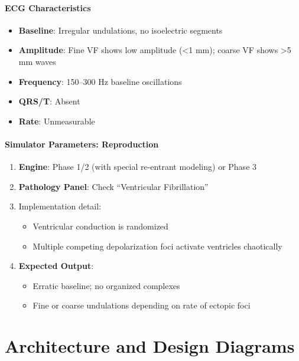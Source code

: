 \documentclass[12pt,a4paper,oneside]{book}
\begin{document}
\subsubsection{ECG Characteristics}

\begin{itemize}
    \item \textbf{Baseline}: Irregular undulations, no isoelectric segments
    \item \textbf{Amplitude}: Fine VF shows low amplitude (<1 mm); coarse VF shows >5 mm waves
    \item \textbf{Frequency}: 150–300 Hz baseline oscillations
    \item \textbf{QRS/T}: Absent
    \item \textbf{Rate}: Unmeasurable
\end{itemize}

\subsubsection{Simulator Parameters: Reproduction}

\begin{enumerate}
    \item \textbf{Engine}: Phase 1/2 (with special re-entrant modeling) or Phase 3
    \item \textbf{Pathology Panel}: Check ``Ventricular Fibrillation''
    \item Implementation detail:
    \begin{itemize}
        \item Ventricular conduction is randomized
        \item Multiple competing depolarization foci activate ventricles chaotically
    \end{itemize}
    \item \textbf{Expected Output}:
    \begin{itemize}
        \item Erratic baseline; no organized complexes
        \item Fine or coarse undulations depending on rate of ectopic foci
    \end{itemize}
\end{enumerate}

\chapter{Architecture and Design Diagrams}
\end{document}
